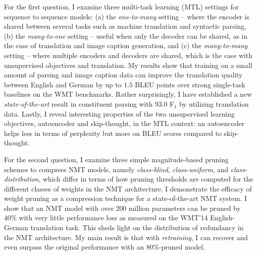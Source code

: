 
For the first question, 
I examine three multi-task learning (MTL) settings for sequence to sequence
models:
(a) the {\it one-to-many} setting -- where the encoder is shared
between several tasks such as machine translation and
syntactic parsing, (b) the {\it many-to-one} setting -- useful when only the
decoder can be shared, as in the case of 
translation and image caption generation, and (c) the {\it
  many-to-many} setting -- where multiple encoders and decoders are
shared, which is the case with unsupervised objectives
and translation.  My results show that training on a small amount of parsing and
image caption data can improve the translation quality between English and
German by up to $1.5$ BLEU
points over strong single-task baselines on the WMT benchmarks. Rather
surprisingly,
I have established a new {\it
state-of-the-art} result in constituent parsing with 93.0 F$_1$ by utilizing
translation data. Lastly, I reveal interesting properties of the two unsupervised learning
objectives, autoencoder and skip-thought, in the MTL context: an autoencoder helps less in terms of
perplexity but more on BLEU scores compared to skip-thought.

For the second question, I examine three simple magnitude-based pruning schemes to compress NMT models, namely {\it class-blind}, {\it class-uniform}, and {\it class-distribution}, which differ in terms of how pruning thresholds are computed for the different classes of weights in the NMT architecture.
I demonstrate the efficacy of weight pruning as a compression technique for a state-of-the-art NMT system. 
I show that an NMT model with over 200 million parameters can be pruned by 40\% with very little performance loss as measured on the WMT'14 English-German translation task. 
This sheds light on the distribution of redundancy in the NMT architecture.
My main result is that with {\it retraining}, I can recover and even surpass the original performance with an 80\%-pruned model. 


